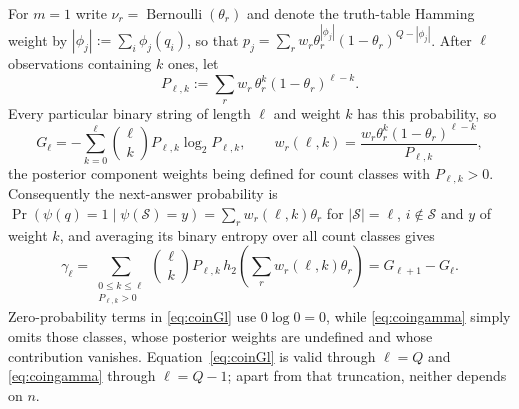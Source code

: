 For $m = 1$ write $\nu_r = \operatorname{Bernoulli}(\theta_r)$ and
denote the truth-table Hamming weight by
$|\phi_j| := \sum_i\phi_j(q_i)$, so that
$p_j = \sum_r w_r\theta_r^{|\phi_j|}(1-\theta_r)^{Q-|\phi_j|}$. After
$\ell$ observations containing $k$ ones, let
%
\begin{equation}
  P_{\ell,k} := \sum_r w_r\,\theta_r^k(1-\theta_r)^{\ell-k}.
  \label{eq:coinPlk}
\end{equation}
%
Every particular binary string of length $\ell$ and weight $k$ has
this probability, so
%
\begin{equation}
  G_\ell = -\sum_{k=0}^{\ell}\binom{\ell}{k}
  P_{\ell,k}\log_2 P_{\ell,k},
  \qquad
  w_r(\ell,k)
  = \frac{w_r\theta_r^k(1-\theta_r)^{\ell-k}}{P_{\ell,k}},
  \label{eq:coinGl}
\end{equation}
%
the posterior component weights being defined for count classes with
$P_{\ell,k} > 0$. Consequently the next-answer probability is
$\Pr(\psi(q) = 1\mid\psi(\mathcal S) = y)
= \sum_r w_r(\ell,k)\theta_r$ for $|\mathcal S| = \ell$,
$i \notin \mathcal S$ and $y$ of weight $k$, and averaging its binary
entropy over all count classes gives
%
\begin{equation}
  \gamma_\ell
  = \sum_{\substack{0\le k\le\ell\\ P_{\ell,k}>0}}
  \binom{\ell}{k}P_{\ell,k}\,
  h_2\!\left(\sum_r w_r(\ell,k)\theta_r\right)
  = G_{\ell+1}-G_\ell .
  \label{eq:coingamma}
\end{equation}
%
Zero-probability terms in \eqref{eq:coinGl} use $0\log 0 = 0$, while
\eqref{eq:coingamma} simply omits those classes, whose posterior
weights are undefined and whose contribution vanishes.
Equation~\eqref{eq:coinGl} is valid through $\ell = Q$ and
\eqref{eq:coingamma} through $\ell = Q-1$; apart from that
truncation, neither depends on $n$.

